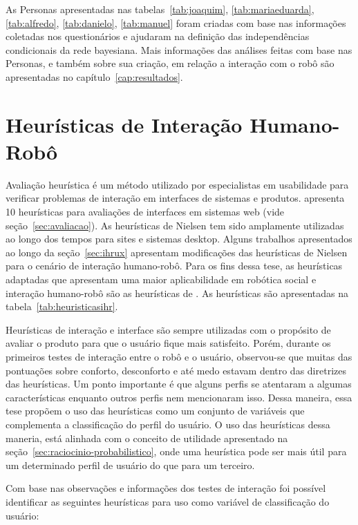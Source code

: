 As Personas apresentadas nas tabelas~\ref{tab:joaquim}, \ref{tab:mariaeduarda}, \ref{tab:alfredo}, \ref{tab:danielo}, \ref{tab:manuel} foram criadas com base nas informações coletadas nos questionários e ajudaram na definição das independências condicionais da rede bayesiana. Mais informações das análises feitas com base nas Personas, e também sobre sua criação, em relação a interação com o robô são apresentadas no capítulo~\ref{cap:resultados}.

\section{Heurísticas de Interação Humano-Robô}
\label{sec:heuristicas}
Avaliação heurística é um método utilizado por especialistas em usabilidade para verificar problemas de interação em interfaces de sistemas e produtos.  apresenta 10 heurísticas para avaliações de interfaces em sistemas web (vide seção~\ref{sec:avaliacao}). As heurísticas de Nielsen tem sido amplamente utilizadas ao longo dos tempos para sites e sistemas desktop. Alguns trabalhos apresentados ao longo da seção~\ref{sec:ihrux} apresentam modificações das heurísticas de Nielsen para o cenário de interação humano-robô. Para os fins dessa tese, as heurísticas adaptadas que apresentam uma maior aplicabilidade em robótica social e interação humano-robô são as heurísticas de . As heurísticas são apresentadas na tabela~\ref{tab:heuristicasihr}.

Heurísticas de interação e interface são sempre utilizadas com o propósito de avaliar o produto para que o usuário fique mais satisfeito. Porém, durante os primeiros testes de interação entre o robô e o usuário, observou-se que muitas das pontuações sobre conforto, desconforto e até medo estavam dentro das diretrizes das heurísticas. Um ponto importante é que alguns perfis se atentaram a algumas características enquanto outros perfis nem mencionaram isso. Dessa maneira, essa tese propõem o uso das heurísticas como um conjunto de variáveis que complementa a classificação do perfil do usuário. O uso das heurísticas dessa maneria, está alinhada com o conceito de utilidade apresentado na seção~\ref{sec:raciocinio-probabilistico}, onde uma heurística pode ser mais útil para um determinado perfil de usuário do que para um terceiro.

Com base nas observações e informações dos testes de interação foi possível identificar as seguintes heurísticas para uso como variável de classificação do usuário:

